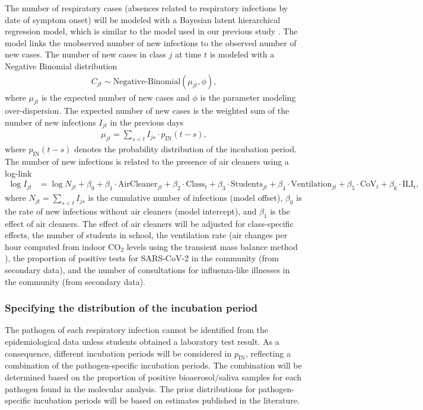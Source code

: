 \documentclass{article}
\begin{document}
The number of respiratory cases (absences related to respiratory infections by date of symptom onset) will be modeled with a Bayesian latent hierarchical regression model, which is similar to the model used in our previous study \cite{Banholzer2023PLoSMed}. The model links the unobserved number of new infections to the observed number of new cases. The number of new cases in class $j$ at time $t$ is modeled with a Negative Binomial distribution   
\begin{align*}
    C_{jt} \sim \text{Negative-Binomial}(\mu_{jt},\phi),
\end{align*}
where $\mu_{jt}$ is the expected number of new cases and $\phi$ is the parameter modeling over-dispersion. The expected number of new cases is the weighted sum of the number of new infections $I_{jt}$ in the  previous days
\begin{align*}
    \mu_{jt} = \sum_{s<t}I_{js} \cdot p_{\text{IN}}(t-s),
\end{align*}
where $p_{\text{IN}}(t-s)$ denotes the probability distribution of the incubation period. The  number of new infections is related to the presence of air cleaners using a log-link
\begin{align*}
    \log I_{jt} &= \log N_{jt} + \beta_0 + \beta_1 \cdot \text{AirCleaner}_{jt} + \beta_2 \cdot \text{Class}_t + \beta_3 \cdot \text{Students}_{jt} + \beta_4 \cdot \text{Ventilation}_{jt} + \beta_5 \cdot \text{CoV}_t + \beta_6 \cdot \text{ILI}_t,
\end{align*}
where $N_{jt} = \sum_{s<t} I_{js}$ is the cumulative number of infections (model offset), $\beta_0$ is the rate of new infections without air cleaners (model intercept), and $\beta_1$ is the effect of air cleaners. The effect of air cleaners will be adjusted for class-specific effects, the number of students in school, the ventilation rate (air changes per hour computed from indoor CO$_2$ levels using the transient mass balance method \cite{Batterman2017IJERPH}), the proportion of positive tests for SARS-CoV-2 in the community (from secondary data), and the number of consultations for influenza-like illnesses in the community (from secondary data). 

\subsubsection*{Specifying the distribution of the incubation period}

The pathogen of each respiratory infection cannot be identified from the epidemiological data unless students obtained a laboratory test result. As a consequence, different incubation periods will be considered in $p_{\text{IN}}$, reflecting a combination of the pathogen-specific incubation periods. The combination will be determined based on the proportion of positive bioaerosol/saliva samples for each pathogen found in the molecular analysis. The prior distributions for pathogen-specific incubation periods will be based on estimates published in the literature. 
\end{document}
